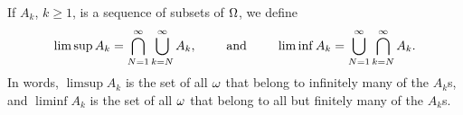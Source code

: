 \documentclass[preprint,  11pt]{amsart}
\begin{document}
%

{} If $A_{k}$, $k\ge 1$, is a sequence of subsets of $\Omega$, we define
\begin{equation*}
\limsup A_{k}=\bigcap_{N=1}^{\infty}\bigcup_{k=N}^{\infty}A_{k}, \qquad \mbox{ and } \qquad  \liminf A_{k}=\bigcup_{N=1}^{\infty}\bigcap_{k=N}^{\infty}A_{k}.
\end{equation*}
In words, $\limsup A_{k}$ is the set of all $\omega$ that belong to infinitely many of the $A_{k}$s, and $\liminf A_{k}$ is the set of all $\omega$ that belong to all but finitely many of the $A_{k}$s.
\end{document}
